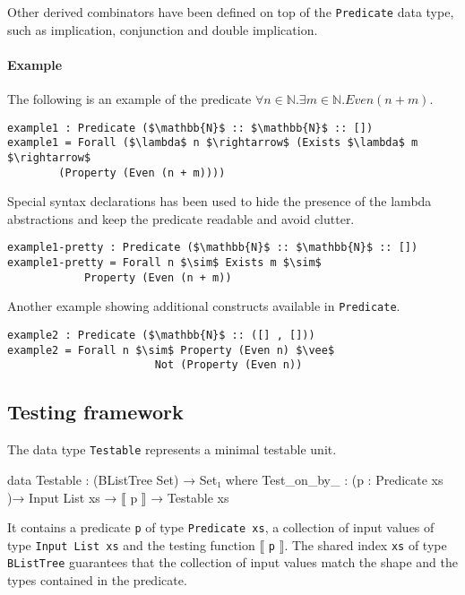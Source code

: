 \documentclass[10pt,a4paper]{article}
\begin{document}
Other derived combinators have been defined on top of the \texttt{Predicate} 
data type, such as implication, conjunction and double implication.

\paragraph{Example}
The following is an example of the predicate $\forall n \in \mathbb{N} . \exists m \in \mathbb{N} . Even (n + m)$.
\begin{lstlisting}
example1 : Predicate ($\mathbb{N}$ :: $\mathbb{N}$ :: [])
example1 = Forall ($\lambda$ n $\rightarrow$ (Exists $\lambda$ m $\rightarrow$
		(Property (Even (n + m))))
\end{lstlisting}
Special syntax declarations has been used to hide the presence of the lambda abstractions and keep the predicate readable and avoid clutter.
\begin{lstlisting}
example1-pretty : Predicate ($\mathbb{N}$ :: $\mathbb{N}$ :: [])
example1-pretty = Forall n $\sim$ Exists m $\sim$ 
			Property (Even (n + m))
\end{lstlisting}
Another example showing additional constructs available in \texttt{Predicate}.
\begin{lstlisting}
example2 : Predicate ($\mathbb{N}$ :: ([] , []))
example2 = Forall n $\sim$ Property (Even n) $\vee$ 
                       Not (Property (Even n))
\end{lstlisting}

\subsection{Testing framework}
\label{sec:testing}
The data type \texttt{Testable} represents a minimal testable unit.

\begin{code}
data Testable : (BListTree Set) → Set₁ where
  Test_on_by_ : (p : Predicate xs )→ Input List xs →  ⟦ p ⟧ → Testable xs
\end{code}

It contains a predicate \texttt{p} of type \texttt{Predicate xs}, a collection of input values of type \texttt{Input List xs} and the testing function $\llbracket$ \texttt{p} $ \rrbracket$. The shared index \texttt{xs} of type \texttt{BListTree} guarantees that the collection of input values match the shape and the types contained in the predicate.
\end{document}
